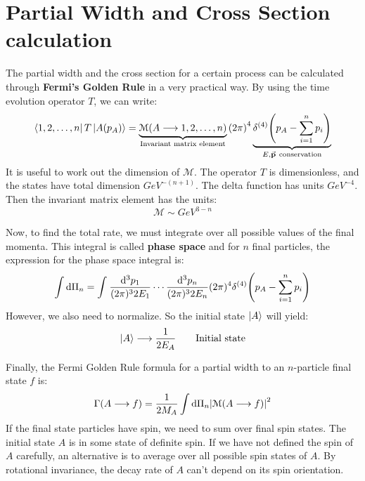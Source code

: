\documentclass[../../main/main.tex]{subfiles}
\begin{document}
\section{Partial Width and Cross Section calculation}
The partial width and the cross section for a certain process can be calculated through \textbf{Fermi's Golden Rule} in a very practical way. By using the time evolution operator \( T \), we can write:
\begin{equation}
    \bra{1,2,\dots,n} T \ket{A(p_A)}
    =
    \underbrace{\mathcal{M}(A \longrightarrow 1,2,\dots,n)}_{\text{Invariant matrix element}} \qty(2\pi)^4 \underbrace{\delta^{(4)} \qty(p_A - \sum_{i=1}^{n} p_i )}_{E, \va{p} \ \text{conservation}}
    \label{eq:}
\end{equation}
It is useful to work out the dimension of \( \mathcal{M} \). The operator \( T \) is dimensionless, and the states have total dimension \( \si{GeV^{-(n+1)}} \). The delta function has units \( \si{GeV^{-4}} \). Then the invariant matrix element has the units:
\begin{equation}
	\mathcal{M} \sim \si{GeV^{3-n}}
	\label{eq:L03_MED}
\end{equation}

Now, to find the total rate, we must integrate over all possible values of the final momenta. This integral is called \textbf{phase space} and for \( n \) final particles, the expression for the phase space integral is:
\begin{equation}
    \int \mathrm{d}{\Pi_{n}}
    =
    \int_{}^{} \frac{\mathrm{d}{^3 p_1}}{(2\pi)^3 2 E_1} \cdots \frac{\mathrm{d}{^3 p_n}}{(2\pi)^3 2 E_n} (2\pi)^4 \delta^{(4)} \qty(p_A - \sum_{i=1}^{n} p_i )
    \label{eq:L03_PSI}
\end{equation}
However, we also need to normalize. So the initial state \( \ket{A} \) will yield:
\begin{equation}
    \ket{A} \longrightarrow \frac{1}{2 E_A} \qquad \text{Initial state}
    \label{eq:L03_ISN}
\end{equation}

Finally, the Fermi Golden Rule formula for a partial width to an \( n \)-particle final state \( f \) is:
\begin{equation}
    \Gamma(A \longrightarrow f)
    =
    \frac{1}{2 M_A} \int \mathrm{d}{\Pi_n} \abs{\mathcal{M}(A \longrightarrow f)}^2
    \label{eq:L03_FGR}
\end{equation}
If the final state particles have spin, we need to sum over final spin states. The initial state \( A \) is in some state of definite spin. If we have not defined the spin of \( A \) carefully, an alternative is to average over all possible spin states of \( A \). By rotational invariance, the decay rate of \( A \) can't depend on its spin orientation.
\end{document}
